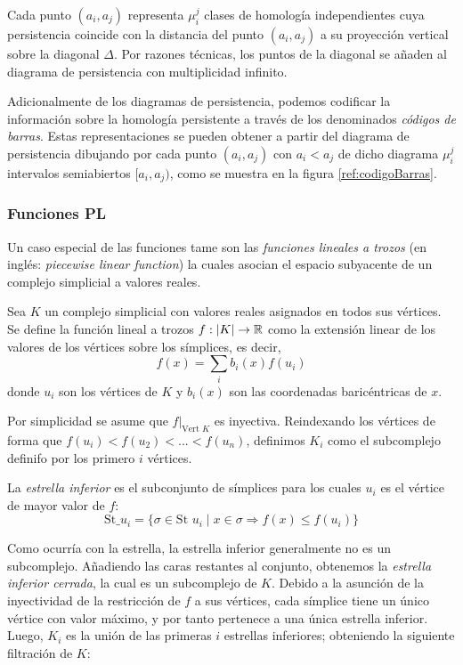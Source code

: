 Cada punto $(a_i, a_j)$ representa $\mu_{i}^{j}$ clases de homología independientes cuya persistencia coincide con la distancia del punto $(a_i, a_j)$ a su proyección vertical sobre la diagonal $\Delta$. Por razones técnicas, los puntos de la diagonal se añaden al diagrama de persistencia con multiplicidad infinito.

Adicionalmente de los diagramas de persistencia, podemos codificar la información sobre la homología persistente a través de los denominados \emph{códigos de barras}. Estas representaciones se pueden obtener a partir del diagrama de persistencia dibujando por cada punto $(a_i, a_j)$ con $a_i < a_j$ de dicho diagrama $\mu_{i}^{j}$ intervalos semiabiertos $[a_i, a_j)$, como se muestra en la figura \ref{ref:codigoBarras}.

\subsubsection*{Funciones PL}
Un caso especial de las funciones tame son las \emph{funciones lineales a trozos} (en inglés: \emph{piecewise linear function}) la cuales asocian el espacio subyacente de un complejo simplicial a valores reales.

\begin{definition}
Sea $K$ un complejo simplicial con valores reales asignados en todos sus vértices. Se define la función lineal a trozos $f: \lvert K\rvert \to \mathbb{R}$ como la extensión linear de los valores de los vértices sobre los símplices, es decir,
\[
f(x)=\sum_{i} b_i(x)f(u_i)
\]
donde $u_i$ son los vértices de $K$ y $b_i(x)$ son las coordenadas baricéntricas de $x$.
\end{definition}
Por simplicidad se asume que $f\vert_{\text{Vert }K}$ es inyectiva. Reindexando los vértices de forma que $f(u_i) < f(u_2) < ... < f(u_n)$, definimos $K_i$ como el subcomplejo  definifo por los primero $i$ vértices.

\begin{definition}
La \emph{estrella inferior} es el subconjunto de símplices para los cuales $u_i$ es el vértice de mayor valor de $f$:
\[
\text{St}\_u_i = \{\sigma \in \text{St }u_i \mid x \in \sigma \Rightarrow f(x) \leq f(u_i)\}
\] 
\end{definition}

Como ocurría con la estrella, la estrella inferior generalmente no es un subcomplejo. Añadiendo las caras restantes al conjunto, obtenemos la \emph{estrella inferior cerrada}, la cual es un subcomplejo de $K$. Debido a la asunción de la inyectividad de la restricción de $f$ a sus vértices, cada símplice tiene un único vértice con valor máximo, y por tanto pertenece a una única estrella inferior. Luego, $K_i$ es la unión de las primeras $i$ estrellas inferiores; obteniendo la siguiente filtración de $K$:

